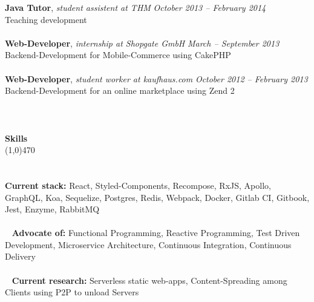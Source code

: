 \documentclass[10pt]{article} %
\begin{document}
\noindent
{\bf Java Tutor}, \textit{student assistent at THM}  \hfill \textit{ October 2013 -- February 2014 } \\ 
Teaching development\\\\
\noindent
{\bf Web-Developer}, \textit{internship at Shopgate GmbH}  \hfill \textit{ March -- September 2013 } \\ 
Backend-Development for Mobile-Commerce using CakePHP\\\\
\noindent
{\bf Web-Developer}, \textit{student worker at kaufhaus.com}  \hfill \textit{ October 2012 -- February 2013 } \\ 
Backend-Development for an online marketplace using Zend 2\\\\
\noindent
\\\\
{\Large \bf Skills}\\
\line(1,0){470}\\
\\\\
\noindent
{\bf Current stack:} React, Styled-Components, Recompose, RxJS, Apollo, GraphQL, Koa, Sequelize, Postgres, Redis, Webpack, Docker, Gitlab CI, Gitbook, Jest, Enzyme, RabbitMQ \\\\\
\noindent
{\bf Advocate of:} Functional Programming, Reactive Programming, Test Driven Development, Microservice Architecture, Continuous Integration, Continuous Delivery \\\\\
\noindent
{\bf Current research:} Serverless static web-apps, Content-Spreading among Clients using P2P to unload Servers \\\\\
\end{document}
